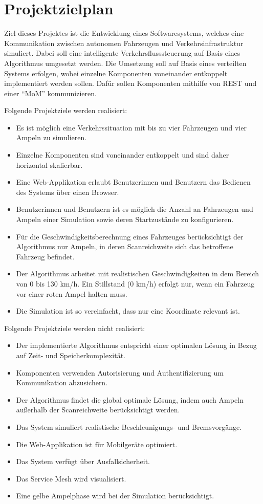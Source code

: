 \section{Projektzielplan}

Ziel dieses Projektes ist die Entwicklung eines Softwaresystems, welches eine Kommunikation zwischen autonomen Fahrzeugen und Verkehrsinfrastruktur simuliert.
Dabei soll eine intelligente Verkehrsflusssteuerung auf Basis eines Algorithmus umgesetzt werden.
Die Umsetzung soll auf Basis eines verteilten Systems erfolgen, wobei einzelne Komponenten voneinander entkoppelt implementiert werden sollen.
Dafür sollen Komponenten mithilfe von REST und einer \enquote{MoM} kommunizieren.

Folgende Projektziele werden realisiert:

\begin{itemize}
  \item Es ist möglich eine Verkehrssituation mit bis zu vier Fahrzeugen und vier Ampeln zu simulieren.
  \item Einzelne Komponenten sind voneinander entkoppelt und sind daher horizontal skalierbar.
  \item Eine Web-Applikation erlaubt Benutzerinnen und Benutzern das Bedienen des Systems über einen Browser.
  \item Benutzerinnen und Benutzern ist es möglich die Anzahl an Fahrzeugen und Ampeln einer Simulation sowie deren Startzustände zu konfigurieren.
  \item Für die Geschwindigkeitsberechnung eines Fahrzeuges berücksichtigt der Algorithmus nur Ampeln, in deren Scanreichweite sich das betroffene Fahrzeug befindet.
  \item Der Algorithmus arbeitet mit realistischen Geschwindigkeiten in dem Bereich von 0 bis 130 km/h. Ein Stillstand (0 km/h) erfolgt nur, wenn ein Fahrzeug vor einer roten Ampel halten muss.
  \item Die Simulation ist so vereinfacht, dass nur eine Koordinate relevant ist.
\end{itemize}

Folgende Projektziele werden nicht realisiert:

\begin{itemize}
  \item Der implementierte Algorithmus entspricht einer optimalen Lösung in Bezug auf Zeit- und Speicherkomplexität.
  \item Komponenten verwenden Autorisierung und Authentifizierung um Kommunikation abzusichern.
  \item Der Algorithmus findet die global optimale Lösung, indem auch Ampeln außerhalb der Scanreichweite berücksichtigt werden.
  \item Das System simuliert realistische Beschleunigungs- und Bremsvorgänge.
  \item Die Web-Applikation ist für Mobilgeräte optimiert.
  \item Das System verfügt über Ausfallsicherheit.
  \item Das Service Mesh wird visualisiert.
  \item Eine gelbe Ampelphase wird bei der Simulation berücksichtigt.
\end{itemize}
